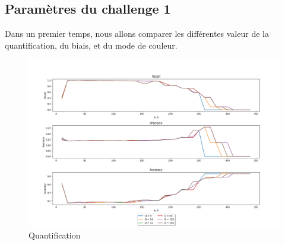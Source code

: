 \documentclass[a4paper,12pt, openany]{book}
\theoremstyle{break}
\begin{document}
\subsection{Paramètres du challenge 1}
Dans un premier temps, nous allons comparer les différentes valeur de la quantification, du biais, et du mode de couleur.

\begin{figure}[H]
  \includegraphics[width=\textwidth]{images/compare_quantification}
  \caption{Quantification}
  \label{fig:quant}
\end{figure}
\end{document}
